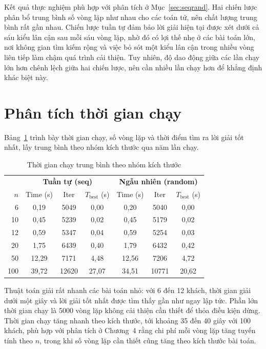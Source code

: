 \documentclass[../DoAn.tex]{subfiles}
\begin{document}
Kết quả thực nghiệm phù hợp với phân tích ở Mục~\ref{sec:seqrand}. Hai chiến lược phân bổ trung bình số vòng lặp như nhau cho các toán tử, nên chất lượng trung bình rất gần nhau. Chiến lược tuần tự đảm bảo lời giải hiện tại được xét dưới cả sáu kiểu lân cận sau mỗi sáu vòng lặp, nhờ đó có lợi thế nhẹ ở các bài toán lớn, nơi không gian tìm kiếm rộng và việc bỏ sót một kiểu lân cận trong nhiều vòng liên tiếp làm chậm quá trình cải thiện. Tuy nhiên, độ dao động giữa các lần chạy lớn hơn chênh lệch giữa hai chiến lược, nên cần nhiều lần chạy hơn để khẳng định khác biệt này.

\section{Phân tích thời gian chạy}
\label{sec:exp_time}

Bảng~\ref{tab:time} trình bày thời gian chạy, số vòng lặp và thời điểm tìm ra lời giải tốt nhất, lấy trung bình theo nhóm kích thước qua năm lần chạy.

\begin{table}[H]
\centering
\caption{Thời gian chạy trung bình theo nhóm kích thước}
\label{tab:time}
\begin{tabular}{r|ccc|ccc}
\toprule
 & \multicolumn{3}{c|}{\textbf{Tuần tự (seq)}} & \multicolumn{3}{c}{\textbf{Ngẫu nhiên (random)}} \\
$n$ & Time (s) & Iter & $T_{\text{best}}$ (s) & Time (s) & Iter & $T_{\text{best}}$ (s) \\
\midrule
6   & 0,19  & 5049  & 0,00  & 0,20  & 5040  & 0,00 \\
10  & 0,45  & 5239  & 0,02  & 0,45  & 5179  & 0,02 \\
12  & 0,59  & 5347  & 0,04  & 0,59  & 5254  & 0,03 \\
20  & 1,75  & 6439  & 0,40  & 1,79  & 6432  & 0,42 \\
50  & 12,29 & 7171  & 4,48  & 12,56 & 7206  & 4,72 \\
100 & 39,72 & 12620 & 27,07 & 34,51 & 10771 & 20,62 \\
\bottomrule
\end{tabular}
\end{table}

Thuật toán giải rất nhanh các bài toán nhỏ: với 6 đến 12 khách, thời gian giải dưới một giây và lời giải tốt nhất được tìm thấy gần như ngay lập tức. Phần lớn thời gian chạy là 5000 vòng lặp không cải thiện cần thiết để thỏa điều kiện dừng. Thời gian chạy tăng nhanh theo kích thước, tới khoảng 35 đến 40 giây với 100 khách, phù hợp với phân tích ở Chương~4 rằng chi phí mỗi vòng lặp tăng tuyến tính theo $n$, trong khi số vòng lặp cần thiết cũng tăng theo kích thước bài toán.
\end{document}
